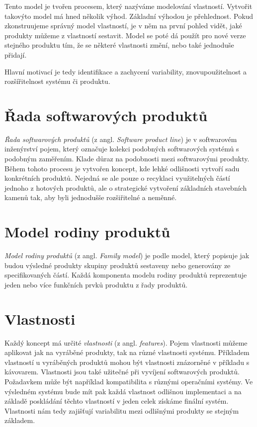 Tento model je tvořen procesem, který nazýváme modelování vlastností. Vytvořit takovýto model má hned několik výhod. Základní výhodou je přehlednost. Pokud zkonstruujeme správný model vlastností, je v něm na první pohled vidět, jaké produkty můžeme z vlastností sestavit. Model se poté dá použít pro nové verze stejného produktu tím, že se některé vlastnosti změní, nebo také jednoduše přidají.

Hlavní motivací je tedy identifikace a zachycení variability, znovupoužitelnost a rozšířitelnost systému či produktu.

\section{Řada softwarových produktů}

\textit{Řada softwarových produktů} (z angl. \textit{Software product line}) je v softwarovém inženýrství pojem, který označuje kolekci podobných softwarových systémů s podobným zaměřením. Klade důraz na podobnosti mezi softwarovými produkty. Během tohoto procesu je vytvořen koncept, kde lehké odlišnosti vytvoří sadu konkrétních produktů. Nejedná se ale pouze o recyklaci využitelných částí jednoho z hotových produktů, ale o strategické vytvoření základních stavebních kamenů tak, aby byli jednodušše rozšiřitelné a neměnné.

\section{Model rodiny produktů}

\textit{Model rodiny produktů} (z angl. \textit{Family model}) je podle \cite{Pure13} model, který popisuje jak budou výsledné produkty skupiny produktů sestaveny nebo generovány ze specifikovaných částí. Každá komponenta modelu rodiny produktů reprezentuje jeden nebo více funkčních prvků produktu z řady produktů.

\section{Vlastnosti}

Každý koncept má určité \textit{vlastnosti} (z angl. \textit{features}). Pojem vlastnosti můžeme aplikovat jak na vyráběné produkty, tak na různé vlastnosti systému. Příkladem vlastností u vyráběných produktů mohou být vlastnosti znázorněné v příkladu s kávovarem. Vlastnosti jsou také užitečné při vyvíjení softwarových produktů. Požadavkem může být například kompatibilita s různými operačními systémy. Ve výsledném systému bude mít pak každá vlastnost odlišnou implementaci a na základě poskládání těchto vlastností v jeden celek získáme finální systém. Vlastnosti nám tedy zajišťují variabilitu mezi odlišnými produkty se stejným základem.

